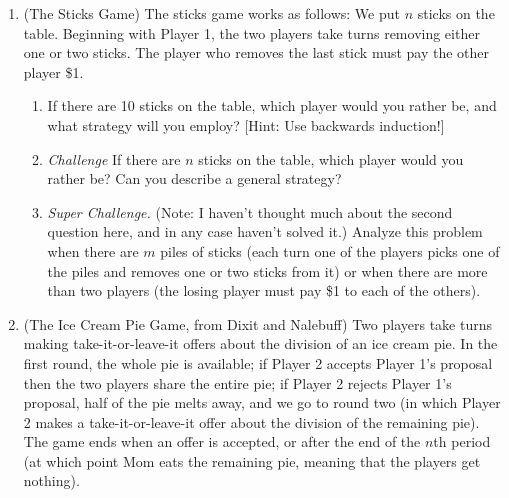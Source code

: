 \begin{enumerate}
\begin{enumerate}
    \end{enumerate}
















\item (The Sticks Game) The sticks game works as follows: We put $n$ sticks on the table. Beginning with Player 1, the two players take turns removing either one or two sticks. The player who removes the last stick must pay the other player \$1.

    \begin{enumerate}

    \item If there are 10 sticks on the table, which player would you rather be, and what strategy will you employ? [Hint: Use backwards induction!]


    \item \emph{Challenge} If there are $n$ sticks on the table, which player would you rather be? Can you describe a general strategy?


    \item \emph{Super Challenge.} (Note: I haven't thought much about the second question here, and in any case haven't solved it.) Analyze this problem when there are $m$ piles of sticks (each turn one of the players picks one of the piles and removes one or two sticks from it) or when there are more than two players (the losing player must pay \$1 to each of the others).

    \end{enumerate}








\item (The Ice Cream Pie Game, from Dixit and Nalebuff) Two players take turns making take-it-or-leave-it offers about the division of an ice cream pie. In the first round, the whole pie is available; if Player 2 accepts Player 1's proposal then the two players share the entire pie; if Player 2 rejects Player 1's proposal, half of the pie melts away, and we go to round two (in which Player 2 makes a take-it-or-leave-it offer about the division of the remaining pie). The game ends when an offer is accepted, or after the end of the $n$th period (at which point Mom eats the remaining pie, meaning that the players get nothing).


\end{enumerate}
